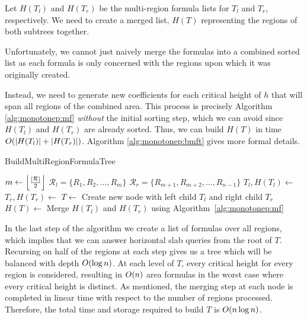 Let $H(T_l)$ and $H(T_r)$ be the multi-region formula lists for $T_l$ and $T_r$, respectively. We need to create a merged list, $H(T)$ representing the regions of both subtrees together. 

Unfortunately, we cannot just naively merge the formulas into a combined sorted list as each formula is only concerned with the regions upon which it was originally created. 

Instead, we need to generate new coefficients for each critical height of $h$ that will span all regions of the combined area. This process is precisely Algorithm \ref{alg:monotonep:mf} \emph{without} the initial sorting step, which we can avoid since $H(T_l)$ and $H(T_r)$ are already sorted.  Thus, we can build $H(T)$ in time $O\!\left(|H(T_l)| + |H(T_r)|\right)$.  Algorithm \ref{alg:monotonep:bmft} gives more formal details.

\begin{algorithm}
\LinesNumbered
\DontPrintSemicolon
\caption{BuildMultiRegionFormulaTree}
\label{alg:monotonep:bmft}
\BlankLine
{}
$m \gets \left\lfloor\frac{|\mathcal{R}|}{2}\right\rfloor$\;
$\mathcal{R}_l = \{ R_1, R_2, \ldots, R_m \}$\;
$\mathcal{R}_r = \{ R_{m+1}, R_{m+2}, \ldots, R_{n-1} \}$\;
$T_l, H(T_l) \gets $ \;
$T_r, H(T_r) \gets $ \;
$T \gets $ Create new node with left child $T_l$ and right child $T_r$\;
$H(T) \gets $ Merge $H(T_l)$ and $H(T_r)$ using Algorithm~\ref{alg:monotonep:mf}\;
\BlankLine
{}
\end{algorithm}

In the last step of the algorithm we create a list of formulas over all regions, which implies that we can answer horizontal slab queries from the root of $T$. Recursing on half of the regions at each step gives us a tree which will be balanced with depth $O\!\left(\log{n}\right)$. At each level of $T$, every critical height for every region is considered, resulting in $O\!\left(n\right)$ area formulas in the worst case where every critical height is distinct. As mentioned, the merging step at each node is completed in linear time with respect to the number of regions processed. Therefore, the total time and storage required to build $T$ is $O\!\left(n\log{n}\right)$.  


